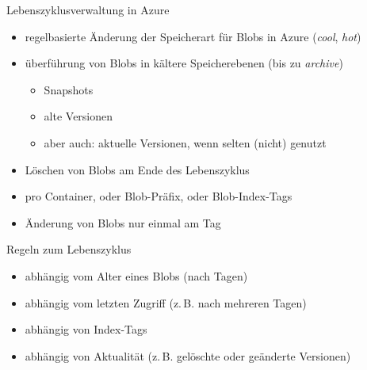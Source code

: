\begin{flashcard}[Definition]{Lebenszyklusverwaltung in Azure}
  \begin{itemize}
    \item regelbasierte Änderung der Speicherart für Blobs in Azure (\emph{cool}, \emph{hot})
    \item überführung von Blobs in kältere Speicherebenen (bis zu \emph{archive})
      \begin{itemize}
        \item Snapshots
        \item alte Versionen
        \item aber auch: aktuelle Versionen, wenn selten (nicht) genutzt
      \end{itemize}
     \item Löschen von Blobs am Ende des Lebenszyklus
     \item pro Container, oder Blob-Präfix, oder Blob-Index-Tags
     \item Änderung von Blobs nur einmal am Tag
  \end{itemize}
\end{flashcard}

\begin{flashcard}[Definition]{Regeln zum Lebenszyklus}
  \begin{itemize}
    \item abhängig vom Alter eines Blobs (nach Tagen)
    \item abhängig vom letzten Zugriff (z.\,B. nach mehreren Tagen)
    \item abhängig von Index-Tags
    \item abhängig von Aktualität (z.\,B. gelöschte oder geänderte Versionen)
  \end{itemize}
\end{flashcard}
